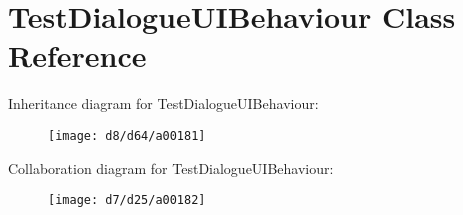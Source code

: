 \hypertarget{a00078}{\section{Test\-Dialogue\-U\-I\-Behaviour Class Reference}
\label{a00078}
}


Inheritance diagram for Test\-Dialogue\-U\-I\-Behaviour\-:
\nopagebreak
\begin{figure}[H]
\begin{center}
\leavevmode
\texttt{[image: d8/d64/a00181]}
\end{center}
\end{figure}


Collaboration diagram for Test\-Dialogue\-U\-I\-Behaviour\-:
\nopagebreak
\begin{figure}[H]
\begin{center}
\leavevmode
\texttt{[image: d7/d25/a00182]}
\end{center}
\end{figure}
